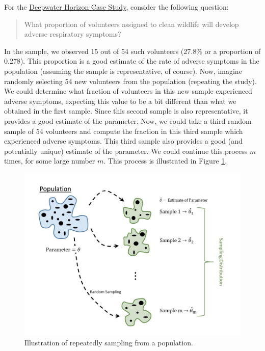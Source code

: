 \documentclass[]{book}
\theoremstyle{definition}
\theoremstyle{definition}
\theoremstyle{remark}
\begin{document}
For the \protect\hyperlink{DeepwaterCase}{Deepwater Horizon Case Study},
consider the following question:

\begin{quote}
What proportion of volunteers assigned to clean wildlife will develop
adverse respiratory symptoms?
\end{quote}

In the sample, we observed 15 out of 54 such volunteers (27.8\% or a
proportion of 0.278). This proportion is a good estimate of the rate of
adverse symptoms in the population (assuming the sample is
representative, of course). Now, imagine randomly selecting 54 new
volunteers from the population (repeating the study). We could determine
what fraction of volunteers in this new sample experienced adverse
symptoms, expecting this value to be a bit different than what we
obtained in the first sample. Since this second sample is also
representative, it provides a good estimate of the parameter. Now, we
could take a third random sample of 54 volunteers and compute the
fraction in this third sample which experienced adverse symptoms. This
third sample also provides a good (and potentially unique) estimate of
the parameter. We could continue this process \(m\) times, for some
large number \(m\). This process is illustrated in Figure
\ref{fig:samplingdistns-sampling-distribution}.

\begin{figure}

{\centering \includegraphics[width=0.8\linewidth]{./images/SamplingDistns-Sampling-Distribution} 

}

\caption{Illustration of repeatedly sampling from a population.}\label{fig:samplingdistns-sampling-distribution}
\end{figure}
\end{document}
